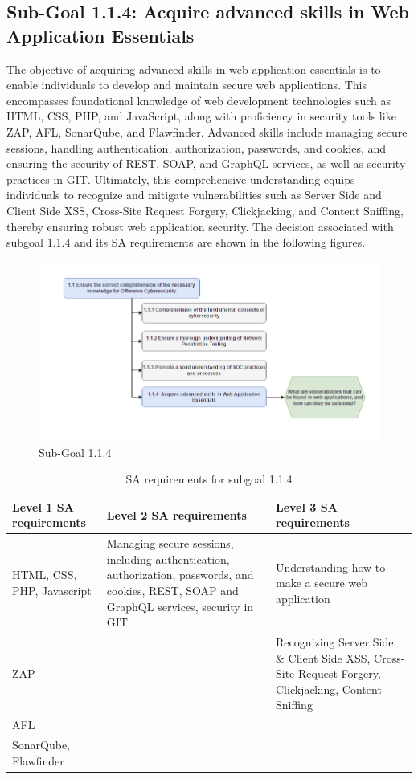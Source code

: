 \newpage
\subsection{Sub-Goal 1.1.4: Acquire advanced skills in Web Application Essentials}
The objective of acquiring advanced skills in web application essentials is to enable individuals to develop and maintain secure web applications. This encompasses foundational knowledge of web development technologies such as HTML, CSS, PHP, and JavaScript, along with proficiency in security tools like ZAP, AFL, SonarQube, and Flawfinder. Advanced skills include managing secure sessions, handling authentication, authorization, passwords, and cookies, and ensuring the security of REST, SOAP, and GraphQL services, as well as security practices in GIT. Ultimately, this comprehensive understanding equips individuals to recognize and mitigate vulnerabilities such as Server Side and Client Side XSS, Cross-Site Request Forgery, Clickjacking, and Content Sniffing, thereby ensuring robust web application security.
The decision associated with subgoal 1.1.4 and its SA requirements are shown in the following figures.

\begin{figure}[H]
    \centering
    \includegraphics[width=\textwidth]{./assets/subgoal_1.1.4.png}
    \caption{Sub-Goal 1.1.4}
    \label{fig:subgoal1.1.4}
\end{figure}

\begin{table}[H]
\begin{center}
\begin{tabular}{ | m{5cm} | m{5cm}| m{5cm} | } 
  \hline
  \textbf{Level 1 SA requirements} & \textbf{Level 2 SA requirements}  & \textbf{Level 3 SA requirements}  \\ 
  \hline
  HTML, CSS, PHP, Javascript & Managing secure sessions, including authentication, authorization, passwords, and cookies, REST, SOAP and GraphQL services, security in GIT & Understanding how to make a secure web application\\ 
  \hline
  ZAP &  & Recognizing Server Side \& Client Side XSS, Cross-Site Request Forgery, Clickjacking, Content Sniffing\\ 
  \hline
  AFL &  & \\ 
  \hline
  SonarQube, Flawfinder &  & \\ 
  \hline
\end{tabular}
\end{center}
\caption{SA requirements for subgoal 1.1.4}
\end{table}


